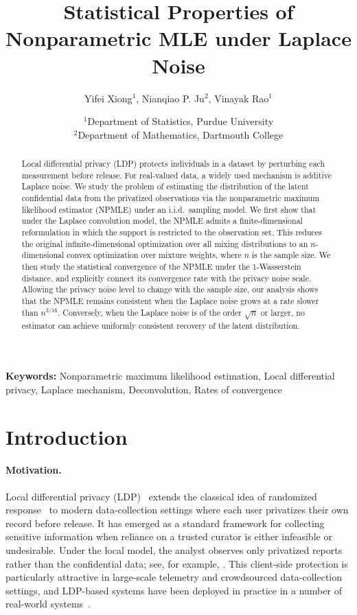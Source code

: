 \documentclass[english, 11pt]{article}
\title{Statistical Properties of Nonparametric MLE under Laplace Noise}
\author{Yifei Xiong$^1$, Nianqiao P. Ju$^2$, Vinayak Rao$^1$}
\date{%
    $^1$Department of Statistics, Purdue University\\%
    $^2$Department of Mathematics, Dartmouth College\\%
}
\theoremstyle{plain}
\theoremstyle{definition}
\theoremstyle{remark}
\begin{document}
 
\maketitle

\begin{abstract}
Local differential privacy (LDP) protects individuals in a dataset by perturbing each measurement before release.
For real-valued data, a widely used mechanism is additive Laplace noise.
We study the problem of estimating the distribution of the latent confidential data from the privatized observations via the nonparametric maximum likelihood estimator (NPMLE) under an i.i.d.\ sampling model.
We first show that under the Laplace convolution model, the NPMLE admits a finite-dimensional reformulation in which the support is restricted to the observation set. 
This reduces the original infinite-dimensional optimization over all mixing distributions to an $n$-dimensional convex optimization over mixture weights, where $n$ is the sample size.
We then study the statistical convergence of the NPMLE under the 1-Wasserstein distance, and explicitly connect its convergence rate with the privacy noise scale.
Allowing the privacy noise level to change with the sample size, our analysis shows that the NPMLE remains consistent when the Laplace noise grows at a rate slower than $n^{3/16}$.
Conversely, when the Laplace noise is of the order $\sqrt n$ or larger, no estimator can achieve uniformly consistent recovery of the latent distribution.
\end{abstract}

\textbf{Keywords:} Nonparametric maximum likelihood estimation, Local differential privacy, Laplace mechanism, Deconvolution, Rates of convergence


\section{Introduction}\label{sec:intro}

\paragraph{Motivation.}Local differential privacy (LDP)~\citep{kasiviswanathan2011can,duchi2013local} extends the classical idea of randomized response~\citep{warner1965randomized} to modern data-collection settings where each user privatizes their own record before release.
It has emerged as a standard framework for collecting sensitive information when reliance on a trusted curator is either infeasible or undesirable.
Under the local model, the analyst observes only privatized reports rather than the confidential data; see, for example, \cite{cormode2018privacy,yang2024local,wang2020comprehensive}.
This client-side protection is particularly attractive in large-scale telemetry and crowdsourced data-collection settings, and LDP-based systems have been deployed in practice in a number of real-world systems~\citep{erlingsson2014rappor,ding2017collecting}.
\end{document}
